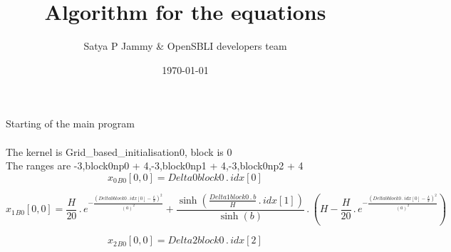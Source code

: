 \documentclass{article}
\title{Algorithm for the equations}
\author{Satya P Jammy \& OpenSBLI developers team}
\date{\today}
\begin{document}
\maketitle
\noindent Starting of the main program\\
\\\noindent The kernel is Grid_based_initialisation0, block is 0\\\noindent The ranges are -3,block0np0 + 4,-3,block0np1 + 4,-3,block0np2 + 4\\\begin{dmath}{x_{0}{_{B0}}}[{0,0}] = Delta0block0 \,.\, {idx}[{0}]\end{dmath}

\begin{dmath}{x_{1}{_{B0}}}[{0,0}] = \frac{H}{20} \,.\, e^{- \frac{\left(Delta0block0 \,.\, {idx}[{0}] - \frac{L}{2} \right)^{2}}{\left(a \right)^{2}}} + \frac{\sinh{\left (\frac{Delta1block0 \,.\, b}{H} \,.\, {idx}[{1}] \right )}}{\sinh{\left (b 
\right )}} \,.\, \left(H - \frac{H}{20} \,.\, e^{- \frac{\left(Delta0block0 \,.\, {idx}[{0}] - \frac{L}{2} \right)^{2}}{\left(a \right)^{2}}}\right)\end{dmath}

\begin{dmath}{x_{2}{_{B0}}}[{0,0}] = Delta2block0 \,.\, {idx}[{2}]\end{dmath}
\end{document}
